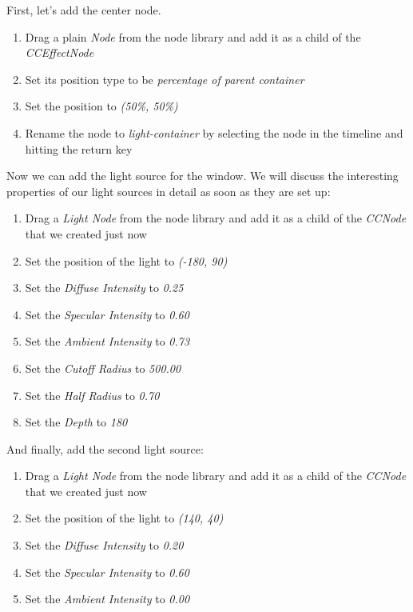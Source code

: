 \begin{leftbar}
First, let's add the center node.
\begin{enumerate}
  \item Drag a plain \textit{Node} from the node library and add it as a child
  of the \textit{CCEffectNode}
  \item Set its position type to be \textit{percentage of parent container}
  \item Set the position to \textit{(50\%, 50\%)}
  \item Rename the node to \textit{light-container} by selecting the node in the
  timeline and hitting the return key
\end{enumerate}
Now we can add the light source for the window. We will discuss the interesting
properties of our light sources in detail as soon as they are set up:
\begin{enumerate}
  \item Drag a \textit{Light Node} from the node library and add it as a child
  of the \textit{CCNode} that we created just now
  \item Set the position of the light to \textit{(-180, 90)}
  \item Set the \textit{Diffuse Intensity} to \textit{0.25}
  \item Set the \textit{Specular Intensity} to \textit{0.60}
  \item Set the \textit{Ambient Intensity} to \textit{0.73}
  \item Set the \textit{Cutoff Radius} to \textit{500.00}
  \item Set the \textit{Half Radius} to \textit{0.70}
  \item Set the \textit{Depth} to \textit{180}
\end{enumerate}
And finally, add the second light source:
\begin{enumerate}
  \item Drag a \textit{Light Node} from the node library and add it as a child
  of the \textit{CCNode} that we created just now
  \item Set the position of the light to \textit{(140, 40)}
  \item Set the \textit{Diffuse Intensity} to \textit{0.20}
  \item Set the \textit{Specular Intensity} to \textit{0.60}
  \item Set the \textit{Ambient Intensity} to \textit{0.00}
\end{enumerate}
\end{leftbar}

